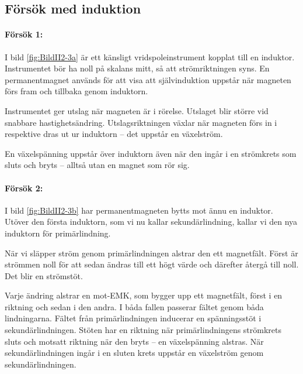 \subsection{Försök med induktion}


\paragraph{Försök 1:}
I bild \ref{fig:BildII2-3a} är ett känsligt vridspoleinstrument kopplat
till en induktor.
Instrumentet bör ha noll på skalans mitt, så att strömriktningen syns.
En permanentmagnet används för att visa att självinduktion uppstår när
magneten förs fram och tillbaka genom induktorn.

Instrumentet ger utslag när magneten är i rörelse. Utslaget blir större vid
snabbare hastighetsändring. Utslagsriktningen växlar när magneten förs in i
respektive dras ut ur induktorn -- det uppstår en växelström.

En växelspänning uppstår över induktorn även när den ingår i en strömkrets som
sluts och bryts -- alltså utan en magnet som rör sig.

\paragraph{Försök 2:}
I bild \ref{fig:BildII2-3b} har permanentmagneten bytts mot ännu en
induktor.
Utöver den första induktorn, som vi nu kallar sekundärlindning, kallar vi den
nya induktorn för primärlindning.

När vi släpper ström genom primärlindningen alstrar den ett magnetfält.
Först är strömmen noll för att sedan ändras till ett högt värde och därefter
återgå till noll. Det blir en strömstöt.

Varje ändring alstrar en mot-EMK, som bygger upp ett magnetfält, först i en
riktning och sedan i den andra. I båda fallen passerar fältet genom båda
lindningarna. Fältet från primärlindningen inducerar en spänningsstöt i
sekundärlindningen. Stöten har en riktning när primärlindningens strömkrets
sluts och motsatt riktning när den bryts -- en växelspänning alstras.
När sekundärlindningen ingår i en sluten krets uppstår en växelström genom
sekundärlindningen.

